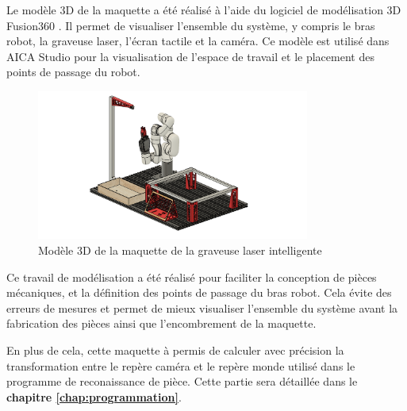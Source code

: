Le modèle 3D de la maquette a été réalisé à l'aide du logiciel de modélisation 3D Fusion360 \cite{Fusion360Docs}. Il permet de visualiser l'ensemble du système, y compris le bras robot, la graveuse laser, l'écran tactile et la caméra. Ce modèle est utilisé dans AICA Studio pour la visualisation de l'espace de travail et le placement des points de passage du robot.

\begin{figure}[H]
    \centering
    \includegraphics[width=0.8\textwidth]{assets/figures/modele_3d.png}
    \caption{Modèle 3D de la maquette de la graveuse laser intelligente}
    \label{fig:maquette_3d}
\end{figure}

Ce travail de modélisation a été réalisé pour faciliter la conception de pièces mécaniques, et la définition des points de passage du bras robot. Cela évite des erreurs de mesures et permet de mieux visualiser l'ensemble du système avant la fabrication des pièces ainsi que l'encombrement de la maquette.

En plus de cela, cette maquette à permis de calculer avec précision la transformation entre le repère caméra et le repère monde utilisé dans le programme de reconaissance de pièce. Cette partie sera détaillée dans le \textbf{chapitre \ref{chap:programmation}}.
